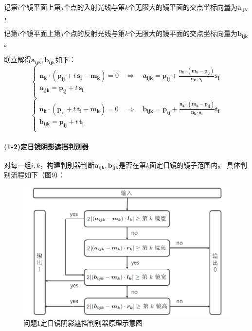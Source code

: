 \documentclass{article}
\numberwithin{equation}{subsection}
\begin{document}
\vskip 0.25cm
\noindent
记第$i$个镜平面上第$j$个点的入射光线与第$k$个无限大的镜平面的交点坐标向量为$\bm{a_{ijk}}$，

\noindent
记第$i$个镜平面上第$j$个点的反射光线与第$k$个无限大的镜平面的交点坐标向量为$\bm{b_{ijk}}$。

\noindent
联立解得$\bm{a_{ijk}},\bm{b_{ijk}}$如下：
\begin{equation}
    \left\{\begin{array}{l}
        \bm{n_k}\cdot(\bm{p_{ij}}+t\,\bm{s_i}-\bm{m_k})=0 \quad \Rightarrow \quad \bm{a_{ijk}}=\bm{p_{ij}}+\frac{\bm{n_k}\cdot (\bm{m_k}-\bm{p_{ij}})}{\bm{n_k}\cdot \bm{s_i}} \bm{s_i}\\
        \bm{a_{ijk}}=\bm{p_{ij}}+t\,\bm{s_i}\\
    \end{array}\right.
\end{equation}
\begin{equation}
    \left\{\begin{array}{l}
        \bm{n_k}\cdot(\bm{p_{ij}}+t\,\bm{t_i}-\bm{m_k})=0 \quad \Rightarrow \quad \bm{b_{ijk}}=\bm{p_{ij}}+\frac{\bm{n_k}\cdot (\bm{m_k}-\bm{p_{ij}})}{\bm{n_k}\cdot \bm{s_i}} \bm{t_i}\\
        \bm{b_{ijk}}=\bm{p_{ij}}+t\,\bm{t_i}\\
    \end{array}\right.
\end{equation}


\paragraph{(1-2)定日镜阴影遮挡判别器}

对每一组$i,k$，构建判别器判断$\bm{a_{ijk}},\bm{b_{ijk}}$是否在第$k$面定日镜的镜子范围内。
具体判别流程如下（图9）：
\begin{figure}[H]
    \centering
    \includegraphics[scale=0.45]{问题1-1定日镜阴影遮挡判别器原理.png}
    \caption{问题1定日镜阴影遮挡判别器原理示意图}
\end{figure}
\end{document}
